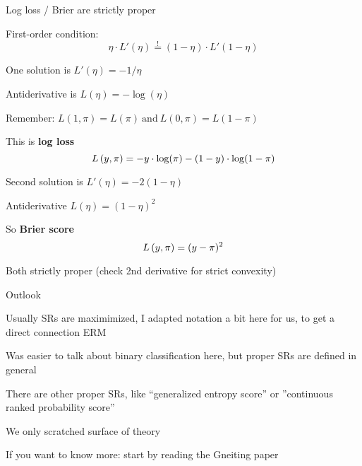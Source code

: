 \documentclass[11pt,compress,t,notes=noshow, xcolor=table]{beamer}
\begin{document}
\begin{framei}[sep=M]{Log loss / Brier are strictly proper}

\item First-order condition: 
$$\eta \cdot L'(\eta) \overset{!}{=} (1-\eta) \cdot L'(1-\eta)$$
\item One solution is $L'(\eta)=-1/\eta$ %
\item Antiderivative is $L(\eta)=-\log(\eta)$ 
\item Remember: 
$L(1, \pi) = L(\pi) \ \text{and} \ L(0, \pi) = L(1-\pi)$
\item This is \textbf{log loss} 
$$L\left(y, \pi\right)=-y \cdot \log(\pi) - (1-y) \cdot \log(1-\pi)$$

\item Second solution is $L'(\eta)=-2(1-\eta)$%
\item Antiderivative $L(\eta)=(1-\eta)^2$%
\item So \textbf{Brier score} 
$$L\left(y, \pi\right)=(y - \pi)^2$$


\item Both strictly proper (check 2nd derivative for strict convexity)


\end{framei}

\begin{framei}[sep=L]{Outlook}

\item Usually SRs are maximimized, I adapted notation a bit here
for us, to get a direct connection ERM

\item Was easier to talk about binary classification here, 
but proper SRs are defined in general

\item There are other proper SRs, like ``generalized entropy score'' or ''continuous ranked probability score'' 

\item We only scratched surface of theory

\item  If you want to know more: start by reading the Gneiting paper

\end{framei}



\endlecture
\end{document}
